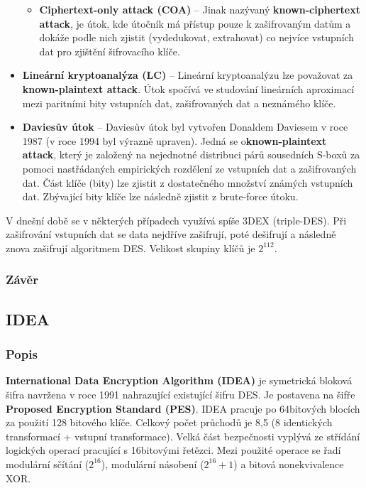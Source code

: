 \documentclass[12pt, a4paper]{article}
\begin{document}
\begin{itemize}
\begin{itemize}
				\item \textbf{Ciphertext-only attack (COA)} -- Jinak nazývaný \textbf{known-ciphertext attack}, je útok, kde útočník má přístup pouze k zašifrovaným datům a dokáže podle nich zjistit (vydedukovat, extrahovat) co nejvíce vstupních dat pro zjištění šifrovacího klíče.
			\end{itemize}
			\item \textbf{Lineární kryptoanalýza (LC)} -- Lineární kryptoanalýzu lze považovat za \textbf{known-plaintext attack}. Útok spočívá ve studování lineárních aproximací mezi paritními bity vstupních dat, zašifrovaných dat a neznámého klíče.
			\item \textbf{Daviesův útok} -- Daviesův útok byl vytvořen Donaldem Daviesem v roce 1987 (v roce 1994 byl výrazně upraven). Jedná se o\textbf{known-plaintext attack}, který je založený na nejednotné distribuci párů sousedních S-boxů za pomoci nastřádaných empirických rozdělení ze vstupních dat a zašifrovaných dat. Část klíče (bity) lze zjistit z dostatečného množství známých vstupních dat. Zbývající bity klíče lze následně zjistit z brute-force útoku. 
		\end{itemize}
	V dnešní době se v některých případech využívá spíše 3DEX (triple-DES). Při zašifrování vstupních dat se data nejdříve zašifrují, poté dešifrují a následně znova zašifrují algoritmem DES. Velikost skupiny klíčů je $2^{112}$.
		\subsubsection{Závěr}
	\subsection{IDEA}
	\label{subsec:idea}
		\subsubsection{Popis}
		\textbf{International Data Encryption Algorithm (IDEA)} je symetrická bloková šifra navržena v roce 1991 nahrazující existující šifru DES. Je postavena na šifře \textbf{Proposed Encryption Standard (PES)}. IDEA pracuje po 64bitových blocích za použití 128 bitového klíče. Celkový počet průchodů je 8,5 (8 identických transformací + vstupní transformace). Velká část bezpečnosti vyplývá ze střídání logických operací pracující s 16bitovými řetězci. Mezi použité operace se řadí modulární sčítání ($2^{16}$), modulární násobení ($2^{16} + 1$) a bitová nonekvivalence XOR. 
\end{document}
